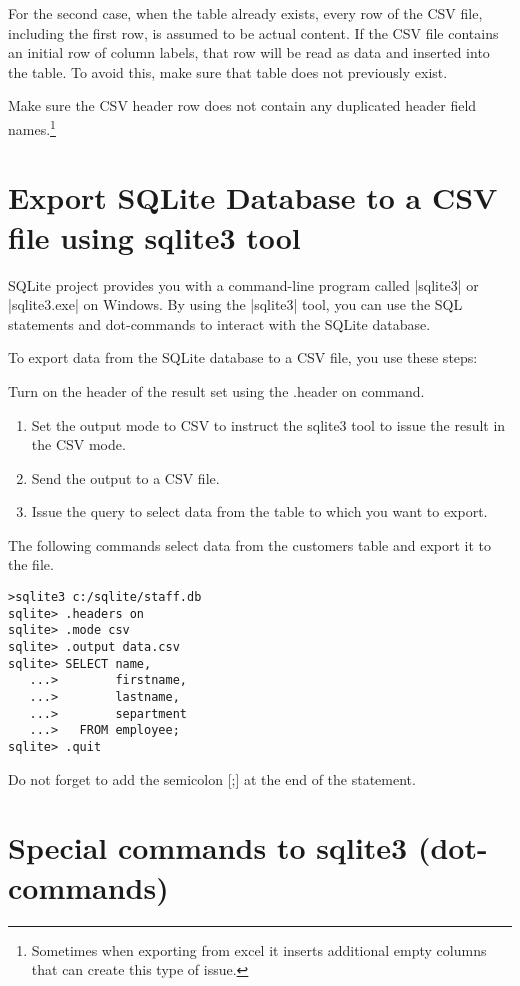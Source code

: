 For the second case, when the table already exists, every row of the CSV file, including the first row, is assumed to be actual content. If the CSV file contains an initial row of column labels, that row will be read as data and inserted into the table. To avoid this, make sure that table does not previously exist.

Make sure the CSV header row does not contain any duplicated header field names.\footnote{Sometimes when exporting from excel it inserts additional empty columns that can create this type of issue.}

\section{Export SQLite Database to a CSV file using sqlite3 tool}


SQLite project provides you with a command-line program called |sqlite3| or |sqlite3.exe| on Windows. By using the |sqlite3| tool, you can use the SQL statements and dot-commands to interact with the SQLite database.

To export data from the SQLite database to a CSV file, you use these steps:

Turn on the header of the result set using the .header on command.

\begin{enumerate}
\item Set the output mode to CSV to instruct the sqlite3 tool to issue the result in the CSV mode.
\item Send the output to a CSV file.
\item Issue the query to select data from the table to which you want to export.
\end{enumerate}


The following commands select data from the customers table and export it to the  file.

\begin{verbatim}
>sqlite3 c:/sqlite/staff.db
sqlite> .headers on
sqlite> .mode csv
sqlite> .output data.csv
sqlite> SELECT name,
   ...>        firstname,
   ...>        lastname,
   ...>        separtment
   ...>   FROM employee;
sqlite> .quit
\end{verbatim}

Do not forget to add the semicolon [;] at the end of the statement.

\section{Special commands to sqlite3 (dot-commands)}


